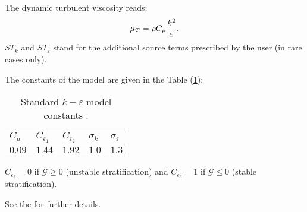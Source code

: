 The dynamic turbulent viscosity reads:
\begin{equation}
\displaystyle \mu_T=\rho C_\mu\frac{k^2}{%
\varepsilon}.
\end{equation}
$ST_{k}$ and $ST_{\varepsilon}$ stand for the additional
source terms prescribed by the user (in rare cases only).

The constants of the model are given in the Table (\ref{tab:k_epsilon_constants}):
\begin{table}[!htp]
\centering
\begin{tabular}{p{}|p{}|p{}|p{}|p{}}
$C_\mu$ & $C_{\varepsilon_1}$ & $C_{\varepsilon_2}$ & $\sigma_k$ & $%
\sigma_\varepsilon$ \\ \hline
$0.09$ & $1.44$ & $1.92$ & $1.0$ & $1.3$
\end{tabular}%
\caption{Standard $k-\varepsilon$ model constants \cite{Launder:1974}.\label{tab:k_epsilon_constants}}
\end{table}

$C_{\varepsilon_3}=0$ if $\mathcal{G}\geqslant0$ (unstable stratification)
and $C_{\varepsilon_3}=1$ if $\mathcal{G}\leqslant0$ (stable stratification).

See the  for further details.



